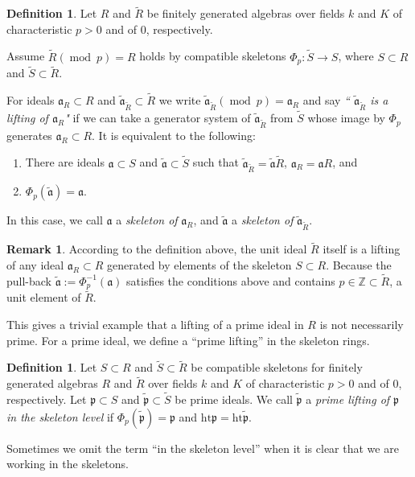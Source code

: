\documentclass[a4paper]{amsart}
\def\ZZ{{\mathbb{Z}}}
\renewcommand{\a}{{\mathfrak{a}}}
\newcommand{\p}{{\mathfrak{p}}}
\renewcommand{\wp}{{\widetilde{\p}}}
\newcommand{\height}{{\mathrm{ht} }}
\renewcommand{\wr}{{\widetilde R}}
\newcommand{\taa}{{\widetilde{\mathfrak a}}}
\newcommand{\ws}{{\widetilde{S}}}
\renewcommand{\mod}{{\operatorname{mod}\ }}
\theoremstyle{definition}
\newtheorem{defn}[thm]{Definition}
\newtheorem{rem}[thm]{Remark}
\begin{document}
\begin{defn} Let $R$ and $\wr$ be finitely generated algebras 
over  fields $k$ and $K$ of characteristic $p>0$ and of 0, respectively.


Assume $\wr (\mod p)=R$ holds by compatible skeletons $\Phi_p: \ws\to S$, where $S\subset R$ and 
        $\ws\subset \wr$.
        
        For  ideals $\a_R\subset R$ and $\taa_\wr\subset \wr$  we write $\taa_\wr(\mod p)=\a_R$ and say
       {\sl  `` $\taa_\wr $ is a lifting of $\a_R$" } if we can take a generator system of $\taa_\wr$ from $\ws$ whose image by $\Phi_p$
        generates
         $\a_R\subset R$. It is equivalent to the following:

       
          \begin{enumerate}
\item There are ideals $\a\subset S$ and $\taa\subset \ws$
       such that $\taa_\wr=\taa\wr$, $\a_R=\a R$, and  
\item         $\Phi_p(\taa)=\a$.
\end{enumerate}
%
 In this case, we call $\a$  a {\sl skeleton of }$\a_R$, and $\taa$  a {\sl skeleton of} $\taa_\wr$.
                
\end{defn}

\begin{rem} According to the definition above, the unit ideal $\wr$ itself is a lifting of any ideal $\a_R\subset R$ generated by
 elements of the skeleton $S\subset R$.
 Because the pull-back $\taa:=\Phi_p^{-1}(\a)$ satisfies the conditions above and contains $p\in \ZZ\subset \wr$,
 a unit element of $\wr$.
 

\end{rem}
\noindent
This gives a trivial example that
 a lifting of a prime ideal in $R$ is not necessarily prime. 
 For a prime ideal, we define a ``prime lifting''
 in the skeleton rings.
%
%

 \begin{defn} \label{def-of-prime-lift}
      Let $S\subset R$ and 
        $\ws\subset \wr$ be compatible skeletons  for finitely generated algebras $R$ and $\wr$  
over  fields $k$ and $K$ of characteristic $p>0$ and of 0, respectively.
Let $\p\subset S$ and $\wp\subset \ws$ be prime ideals.
 We call $\wp$ a {\sl  prime lifting of $\p$ in the skeleton level}  if $\Phi_p(\wp)=\p$ and $\height \p=\height \wp$.

  Sometimes we omit the term ``in the skeleton level'' when it is clear that we are working in the skeletons.
\end{defn}   
    
\end{document}
